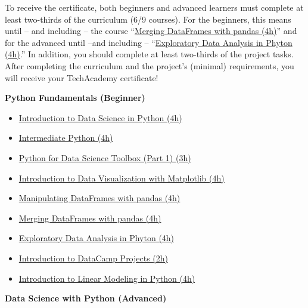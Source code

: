 \documentclass[
  11pt,
]{article}
\providecommand{\tightlist}{%
  \setlength{\itemsep}{0pt}\setlength{\parskip}{0pt}}
\newenvironment{tipsp}[1]
  {
  \begin{itemize}
  \footnotesize
  \renewcommand{\labelitemi}{
    \raisebox{-.7\height}[0pt][0pt]{
      {\setkeys{Gin}{width=3em,keepaspectratio}
        \texttt{[image: images/\#1.png]}}
    }
  }
  \setlength{\fboxsep}{1em}
  \begin{pbox}
  \item
  }
  {
  \end{pbox}
  \end{itemize}
  }
\begin{document}
To receive the certificate, both beginners and advanced learners must complete at least two-thirds of the curriculum (6/9 courses). For the beginners, this means until -- and including -- the course ``\href{https://learn.datacamp.com/courses/merging-dataframes-with-pandas}{Merging DataFrames with pandas (4h)}'' and for the advanced until --and including -- ``\href{https://learn.datacamp.com/courses/exploratory-data-analysis-in-python}{Exploratory Data Analysis in Phyton (4h)}.'' In addition, you should complete at least two-thirds of the project tasks. After completing the curriculum and the project's (minimal) requirements, you will receive your TechAcademy certificate!

\begin{tipsp}p

\textbf{Python Fundamentals (Beginner) }

\begin{itemize}
\tightlist
\item
  \href{https://www.datacamp.com/courses/introduction-to-data-science-in-python}{Introduction to Data Science in Python (4h)}
\item
  \href{https://www.datacamp.com/courses/intermediate-python-for-data-science}{Intermediate Python (4h)}
\item
  \href{https://www.datacamp.com/courses/python-data-science-toolbox-part-1}{Python for Data Science Toolbox (Part 1) (3h)}
\item
  \href{https://www.datacamp.com/courses/introduction-to-matplotlib}{Introduction to Data Visualization with Matplotlib (4h)}
\item
  \href{https://www.datacamp.com/courses/manipulating-dataframes-with-pandas}{Manipulating DataFrames with pandas (4h)}
\item
  \href{https://www.datacamp.com/courses/merging-dataframes-with-pandas}{Merging DataFrames with pandas (4h)}
\item
  \href{https://www.datacamp.com/courses/exploratory-data-analysis-in-python}{Exploratory Data Analysis in Phyton (4h)}
\item
  \href{https://www.datacamp.com/projects/33}{Introduction to DataCamp Projects (2h)}
\item
  \href{https://www.datacamp.com/courses/introduction-to-linear-modeling-in-python}{Introduction to Linear Modeling in Python (4h)}
\end{itemize}

\textbf{Data Science with Python (Advanced) }


\end{tipsp}
\end{document}
